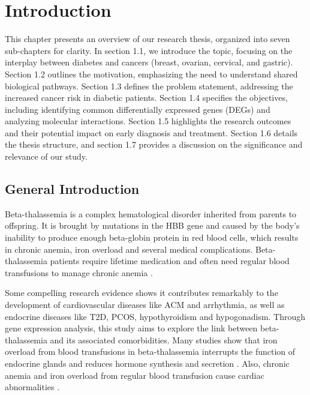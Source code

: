 %
%
\let\textcircled=\pgftextcircled
\chapter{Introduction}
\label{chap:intro}

This chapter presents an overview of our research thesis, organized into seven sub-chapters for clarity. In section 1.1, we introduce the topic, focusing on the interplay between diabetes and cancers (breast, ovarian, cervical, and gastric). Section 1.2 outlines the motivation, emphasizing the need to understand shared biological pathways. Section 1.3 defines the problem statement, addressing the increased cancer risk in diabetic patients. Section 1.4 specifies the objectives, including identifying common differentially expressed genes (DEGs) and analyzing molecular interactions. Section 1.5 highlights the research outcomes and their potential impact on early diagnosis and treatment. Section 1.6 details the thesis structure, and section 1.7 provides a discussion on the significance and relevance of our study.

\vspace{200mm}

\section{General Introduction}
\label{sec:sec1_1}
Beta-thalassemia is a complex hematological disorder inherited from parents to offspring. It is brought by mutations in the HBB gene and caused by the body's inability to produce enough beta-globin protein in red blood cells, which results in chronic anemia, iron overload and several medical complications. Beta-thalassemia patients require lifetime medication and often need regular blood transfusions to manage chronic anemia \cite{b1}.

Some compelling research evidence shows it contributes remarkably to the development of cardiovascular diseases like ACM and arrhythmia, as well as endocrine diseases like T2D, PCOS, hypothyroidism and hypogonadism. Through gene expression analysis, this study aims to explore the link between beta-thalassemia and its associated comorbidities. Many studies show that iron overload from blood transfusions in beta-thalassemia interrupts the function of endocrine glands and reduces hormone synthesis and secretion \cite{b1}. Also, chronic anemia and iron overload from regular blood transfusion cause cardiac abnormalities \cite{b2}.

